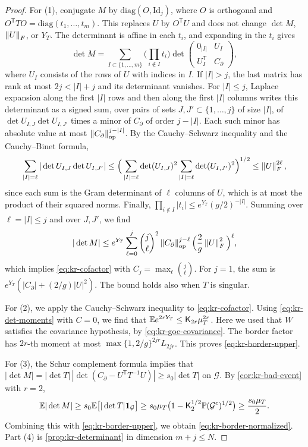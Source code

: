 \begin{proof}
For (1), conjugate $M$ by $\mathrm{diag}(O,\mathrm{Id}_j)$, where $O$ is orthogonal and $O^{\mathsf T}TO=\mathrm{diag}(t_1,\dots,t_m)$. This replaces $U$ by $O^{\mathsf T}U$ and does not change $\det M$, $\left\lVert U\right\rVert_F$, or $Y_T$. The determinant is affine in each $t_i$, and expanding in the $t_i$ gives
\[
\det M=\sum_{I\subset\{1,\dots,m\}}\Big(\prod_{i\notin I}t_i\Big)\det\begin{pmatrix}0_{|I|}&U_I\\U_I^{\mathsf T}&C_\partial\end{pmatrix},
\]
where $U_I$ consists of the rows of $U$ with indices in $I$. If $|I|>j$, the last matrix has rank at most $2j<|I|+j$ and its determinant vanishes. For $|I|\le j$, Laplace expansion along the first $|I|$ rows and then along the first $|I|$ columns writes this determinant as a signed sum, over pairs of sets $J,J'\subset\{1,\dots,j\}$ of size $|I|$, of $\det U_{I,J}\det U_{I,J'}$ times a minor of $C_\partial$ of order $j-|I|$. Each such minor has absolute value at most $\left\lVert C_\partial\right\rVert_{\rm op}^{j-|I|}$. By the Cauchy--Schwarz inequality and the Cauchy--Binet formula,
\[
\sum_{|I|=\ell}|\det U_{I,J}\det U_{I,J'}|\le\Big(\sum_{|I|=\ell}\det(U_{I,J})^2\sum_{|I|=\ell}\det(U_{I,J'})^2\Big)^{1/2}\le\left\lVert U\right\rVert_F^{2\ell},
\]
since each sum is the Gram determinant of $\ell$ columns of $U$, which is at most the product of their squared norms. Finally, $\prod_{i\notin I}|t_i|\le e^{Y_T}(g/2)^{-|I|}$. Summing over $\ell=|I|\le j$ and over $J,J'$, we find
\[
|\det M|\le e^{Y_T}\sum_{\ell=0}^j\binom j\ell^2\left\lVert C_\partial\right\rVert_{\rm op}^{j-\ell}\Big(\frac2g\left\lVert U\right\rVert_F^2\Big)^\ell,
\]
which implies \eqref{eq:kr-cofactor} with $C_j=\max_\ell\binom j\ell$. For $j=1$, the sum is $e^{Y_T}(|C_\partial|+(2/g)|U|^2)$. The bound holds also when $T$ is singular.

For (2), we apply the Cauchy--Schwarz inequality to \eqref{eq:kr-cofactor}. Using \eqref{eq:kr-det-moments} with $C=0$, we find that $\mathbb E e^{2rY_T}\le\mathsf K_{2r}\mu_T^{2r}$. Here we used that $W$ satisfies the covariance hypothesis, by \eqref{eq:kr-goe-covariance}. The border factor has $2r$-th moment at most $\max\{1,2/g\}^{2jr}L_{2jr}$. This proves \eqref{eq:kr-border-upper}.

For (3), the Schur complement formula implies that $|\det M|=|\det T|\,|\det(C_\partial-U^{\mathsf T}T^{-1}U)|\ge s_0|\det T|$ on $\mathcal G$. By \cref{cor:kr-bad-event} with $r=2$,
\[
\mathbb E|\det M|\ge s_0\mathbb E\big[|\det T|\mathbf 1_{\mathcal G}\big]\ge s_0\mu_T\big(1-\mathsf K_2^{1/2}\mathbb P(\mathcal G^c)^{1/2}\big)\ge\frac{s_0\mu_T}2.
\]
Combining this with \eqref{eq:kr-border-upper}, we obtain \eqref{eq:kr-border-normalized}. Part (4) is \cref{prop:kr-determinant} in dimension $m+j\le N$.
\end{proof}

